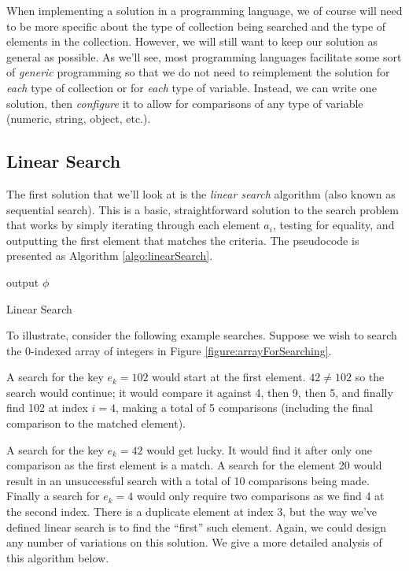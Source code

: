 When implementing a solution in a programming language, we of course
will need to be more specific about the type of collection being
searched and the type of elements in the collection.  However, we
will still want to keep our solution as general as possible.  As we'll 
see, most programming languages facilitate some sort of 
 \emph{generic}
programming so that we do not need to reimplement the solution for
\emph{each} type of collection or for \emph{each} type of variable.  
Instead, we can write one solution, then \emph{configure} it to allow
for comparisons of any type of variable (numeric, string, object, etc.).

\subsection{Linear Search}

The first solution that we'll look at is the \emph{linear search}
algorithm (also known as sequential search).  This is a basic, 
straightforward solution to the search problem that works by simply
iterating through each element $a_i$, testing for equality, and
outputting the first element that matches the criteria.  The
pseudocode is presented as Algorithm \ref{algo:linearSearch}.

\begin{algorithm}[H]
  output $\phi$ \;
\caption{Linear Search}
\label{algo:linearSearch}
\end{algorithm}

To illustrate, consider the following example searches.  Suppose we wish
to search the 0-indexed array of integers in Figure \ref{figure:arrayForSearching}.



A search for the key $e_k = 102$ would start at the first element.  
$42 \neq 102$ so the search would continue; it would compare it against
4, then 9, then 5, and finally find 102 at index $i = 4$, making a
total of 5 comparisons (including the final comparison to the matched
element).  

A search for the key $e_k = 42$ would get lucky.  It would find it
after only one comparison as the first element is a match.  A search
for the element 20 would result in an unsuccessful search with a 
total of 10 comparisons being made.  Finally a search for $e_k = 4$
would only require two comparisons as we find 4 at the second index.
There is a duplicate element at index 3, but the way we've defined
linear search is to find the ``first'' such element.  Again, we could
design any number of variations on this solution. We give a more 
detailed analysis of this algorithm below.


